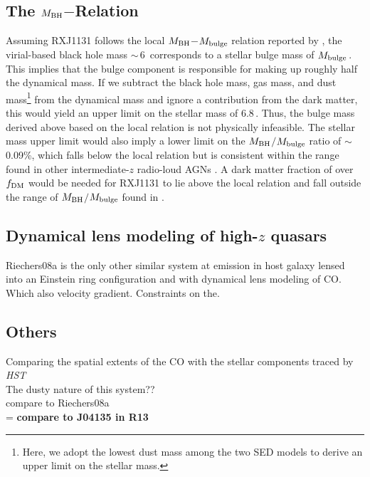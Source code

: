 \documentclass[]{emulateapj}
\begin{document}
\subsection{The $M_{\rm BH}$$-$\mdyn Relation}
Assuming RXJ1131 follows the local $M_{\rm BH}$$-$$M_{\rm bulge}$ relation reported by \citet{HR04a}, 
the virial-based black hole mass \mbh$\sim$\,6\,\Msun \citep{Peng06a} corresponds 
to a stellar bulge mass of $M_{\rm bulge}$\,\Msun.
This implies that the bulge component is responsible for making up roughly half the dynamical mass. 
If we subtract the black hole mass, gas mass, and dust mass\footnote{Here, we adopt the lowest dust mass among the two SED models to derive an upper limit on the stellar mass.}
from the dynamical mass and ignore a contribution from the dark matter, this would
yield an upper limit on the stellar mass of 6.8\,\Msun. 
Thus, the bulge mass derived above based on the local relation is not physically infeasible.
The stellar mass upper limit would also imply a lower limit on the 
$M_{\rm BH}$$/$$M_{\rm bulge}$ ratio of $\sim$0.09\%, which falls below the local relation 
but is consistent within the range found in other intermediate-$z$ radio-loud AGNs \citep{McLure06a}. 
A dark matter fraction of over $f_{\rm DM}$ would be needed for RXJ1131 to 
lie above the local relation and fall outside the range of $M_{\rm BH}$$/$$M_{\rm bulge}$ found in 
\citep{McLure06a}. 

\subsection{Dynamical lens modeling of high-$z$ quasars}
%
Riechers08a is the only other similar system at emission in host galaxy lensed into an Einstein ring configuration and
with dynamical lens modeling of CO.
Which also velocity gradient.
Constraints on the.

\subsection{Others}
Comparing the spatial extents of the CO with the stellar components traced by {\it HST}\\
The dusty nature of this system?? \\
compare to Riechers08a \\=
{\bf compare to J04135 in R13} \\
\end{document}
